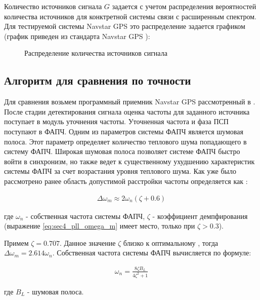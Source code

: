 Количество источников сигнала ${G}$ задается с учетом распределения вероятностей количества источников для конктретной системы
связи с расширенным спектром. Для тестируемой системы Navstar GPS это распределение задается графиком (график приведен из стандарта
Navstar GPS \cite{gpsuserequipment}):
\begin{figure}[ht]
	\center{}
	\caption{Распределение количества источников сигнала}
	\label{pic:sec1_bpsk}
\end{figure}

\subsection{Алгоритм для сравнения по точности}

Для сравнения возьмем программный приемник Navstar GPS рассмотренный в \cite{tsui, akos-book}. 
После стадии детектирования сигнала оценка частоты для заданного источника поступает в модуль уточнения частоты. Уточненная частота и фаза ПСП
поступают в ФАПЧ.  Одним из параметров системы ФАПЧ является шумовая полоса. Этот параметр определяет количество теплового шума попадающего в систему ФАПЧ.
Широкая шумовая полоса позволяет системе ФАПЧ быстро войти в синхронизм, но также ведет к существенному ухудшению характеристик системы ФАПЧ за счет
возрастания уровня теплового шума.  Как уже было рассмотрено ранее область допустимой расстройки частоты определяется как \cite{spilker-book}:
\begin{center}
\begin{eqnarray}
	\label{eq:sec4_pll_omega_m}
	\Delta \omega_m \approx 2 \omega_n (\zeta + 0.6)
\end{eqnarray}
\end{center}
где ${\omega_n}$ - собственная частота системы ФАПЧ, ${\zeta}$ - коэффициент демпфирования (выражение \ref{eq:sec4_pll_omega_m} имеет место,
только при ${\zeta > 0.3}$).

Примем ${\zeta=0.707}$. Данное значение ${\zeta}$ близко к оптимальному \cite{tsui, spilker-book},
тогда ${\Delta \omega_m = 2.614 \omega_n}$. Собственная частота системы ФАПЧ вычисляется по формуле:
\begin{center}
\begin{eqnarray}
	\label{eq:sec4_pll_omega_n}
	\omega_n = \frac{8 \zeta B_L}{4 \zeta^2 + 1}
\end{eqnarray}
\end{center}
где ${B_L}$ - шумовая полоса.

